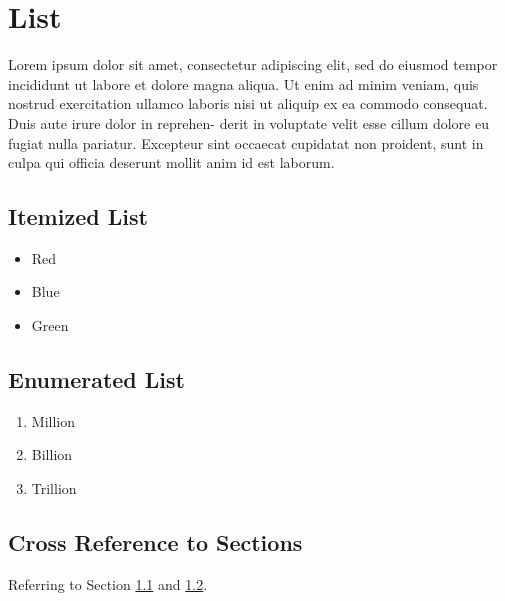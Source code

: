 

\chapter{List}
Lorem ipsum dolor sit amet, consectetur adipiscing elit, sed do eiusmod tempor incididunt
ut labore et dolore magna aliqua. Ut enim ad minim veniam, quis nostrud exercitation
ullamco laboris nisi ut aliquip ex ea commodo consequat. Duis aute irure dolor in reprehen-
derit in voluptate velit esse cillum dolore eu fugiat nulla pariatur. Excepteur sint occaecat
cupidatat non proident, sunt in culpa qui officia deserunt mollit anim id est laborum.

\section{Itemized List}\label{3.1}
\begin{itemize}
	\item Red
	\item Blue
	\item Green
\end{itemize}

\section{Enumerated List}\label{3.2}
\begin{enumerate}
    \item Million
    \item Billion
    \item Trillion
\end{enumerate}
\section{Cross Reference to Sections}
Referring to Section \ref{3.1} and \ref{3.2}.